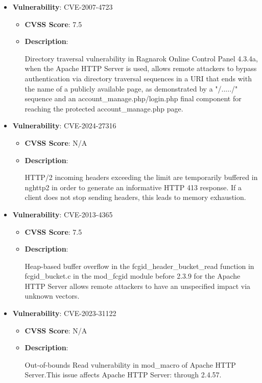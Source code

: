 \documentclass{article}
\begin{document}
\begin{itemize}
        \item \textbf{Vulnerability}: CVE-2007-4723
        \begin{itemize}
            \item \textbf{CVSS Score}:  7.5 
            \item \textbf{Description}:
            \parbox[t]{0.9\linewidth}{
                \ttfamily Directory traversal vulnerability in Ragnarok Online Control Panel 4.3.4a, when the Apache HTTP Server is used, allows remote attackers to bypass authentication via directory traversal sequences in a URI that ends with the name of a publicly available page, as demonstrated by a "/...../" sequence and an account\_manage.php/login.php final component for reaching the protected account\_manage.php page.
            }
        \end{itemize}
    
        \item \textbf{Vulnerability}: CVE-2024-27316
        \begin{itemize}
            \item \textbf{CVSS Score}:  N/A 
            \item \textbf{Description}:
            \parbox[t]{0.9\linewidth}{
                \ttfamily HTTP/2 incoming headers exceeding the limit are temporarily buffered in nghttp2 in order to generate an informative HTTP 413 response. If a client does not stop sending headers, this leads to memory exhaustion.
            }
        \end{itemize}
    
        \item \textbf{Vulnerability}: CVE-2013-4365
        \begin{itemize}
            \item \textbf{CVSS Score}:  7.5 
            \item \textbf{Description}:
            \parbox[t]{0.9\linewidth}{
                \ttfamily Heap-based buffer overflow in the fcgid\_header\_bucket\_read function in fcgid\_bucket.c in the mod\_fcgid module before 2.3.9 for the Apache HTTP Server allows remote attackers to have an unspecified impact via unknown vectors.
            }
        \end{itemize}
    
        \item \textbf{Vulnerability}: CVE-2023-31122
        \begin{itemize}
            \item \textbf{CVSS Score}:  N/A 
            \item \textbf{Description}:
            \parbox[t]{0.9\linewidth}{
                \ttfamily Out-of-bounds Read vulnerability in mod\_macro of Apache HTTP Server.This issue affects Apache HTTP Server: through 2.4.57.
            }
        \end{itemize}
    

\end{itemize}
\end{document}
